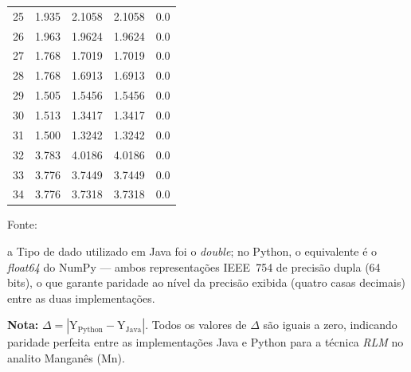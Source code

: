 \begin{table}[H]
\begin{threeparttable}
{\begin{tabular}{
    S[table-format=2.0]
    S[table-format=2.3]
    S[table-format=2.4]
    S[table-format=2.4]
    S[table-format=1.1]
}
25  &  1.935  &  2.1058  &  2.1058  & 0.0 \\
26  &  1.963  &  1.9624  &  1.9624  & 0.0 \\
27  &  1.768  &  1.7019  &  1.7019  & 0.0 \\
28  &  1.768  &  1.6913  &  1.6913  & 0.0 \\
29  &  1.505  &  1.5456  &  1.5456  & 0.0 \\
30  &  1.513  &  1.3417  &  1.3417  & 0.0 \\
31  &  1.500  &  1.3242  &  1.3242  & 0.0 \\
32  &  3.783  &  4.0186  &  4.0186  & 0.0 \\
33  &  3.776  &  3.7449  &  3.7449  & 0.0 \\
34  &  3.776  &  3.7318  &  3.7318  & 0.0 \\
\bottomrule
\end{tabular}%
}
\begin{center}
\begin{minipage}{0.85\linewidth}
\begin{tablenotes}
\footnotesize
\item Fonte:~\oautor
\item[a] Tipo de dado utilizado em Java foi o \textit{double}; no Python,
o equivalente é o \textit{float64} do NumPy — ambos representações IEEE~754
de precisão dupla (64 bits), o que garante paridade ao nível da precisão exibida (quatro casas decimais) entre as
duas implementações.
\item \textbf{Nota:} $\Delta = |\text{Y}_{\text{Python}} - \text{Y}_{\text{Java}}|$.
Todos os valores de $\Delta$ são iguais a zero, indicando paridade
perfeita entre as implementações Java e Python para a técnica \textit{RLM}
no analito Manganês (Mn).
\end{tablenotes}
\end{minipage}
\end{center}
\end{threeparttable}
\end{table}



